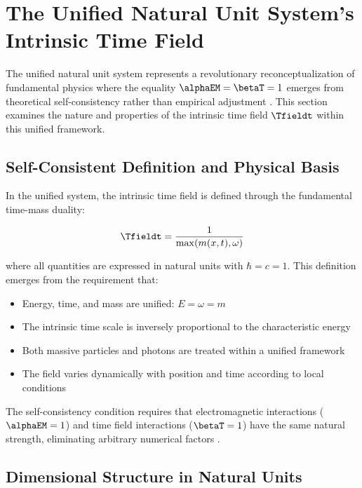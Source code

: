 	\section{The Unified Natural Unit System's Intrinsic Time Field}
	\label{sec:unified_time_field}
	
	The unified natural unit system represents a revolutionary reconceptualization of fundamental physics where the equality $\alphaEM = \betaT = 1$ emerges from theoretical self-consistency rather than empirical adjustment \cite{pascher_unified_2025}. This section examines the nature and properties of the intrinsic time field $\Tfieldt$ within this unified framework.
	
	\subsection{Self-Consistent Definition and Physical Basis}
	\label{subsec:self_consistent_definition}
	
	In the unified system, the intrinsic time field is defined through the fundamental time-mass duality:
	
	\begin{equation}
		\Tfieldt = \frac{1}{\max(m(x,t), \omega)}
	\end{equation}
	
	where all quantities are expressed in natural units with $\hbar = c = 1$. This definition emerges from the requirement that:
	
	\begin{itemize}
		\item Energy, time, and mass are unified: $E = \omega = m$
		\item The intrinsic time scale is inversely proportional to the characteristic energy
		\item Both massive particles and photons are treated within a unified framework
		\item The field varies dynamically with position and time according to local conditions
	\end{itemize}
	
	The self-consistency condition requires that electromagnetic interactions ($\alphaEM = 1$) and time field interactions ($\betaT = 1$) have the same natural strength, eliminating arbitrary numerical factors \cite{pascher_beta_derivation_2025}.
	
	\subsection{Dimensional Structure in Natural Units}
	\label{subsec:dimensional_structure}
	
